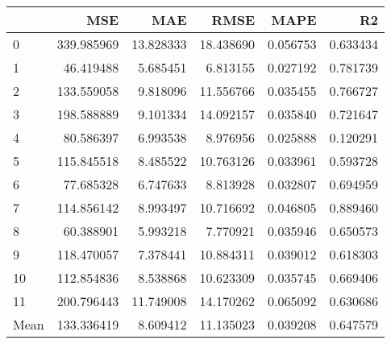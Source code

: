 \begin{tabular}{lrrrrr}
\toprule
 & MSE & MAE & RMSE & MAPE & R2 \\
\midrule
0 & 339.985969 & 13.828333 & 18.438690 & 0.056753 & 0.633434 \\
1 & 46.419488 & 5.685451 & 6.813155 & 0.027192 & 0.781739 \\
2 & 133.559058 & 9.818096 & 11.556766 & 0.035455 & 0.766727 \\
3 & 198.588889 & 9.101334 & 14.092157 & 0.035840 & 0.721647 \\
4 & 80.586397 & 6.993538 & 8.976956 & 0.025888 & 0.120291 \\
5 & 115.845518 & 8.485522 & 10.763126 & 0.033961 & 0.593728 \\
6 & 77.685328 & 6.747633 & 8.813928 & 0.032807 & 0.694959 \\
7 & 114.856142 & 8.993497 & 10.716692 & 0.046805 & 0.889460 \\
8 & 60.388901 & 5.993218 & 7.770921 & 0.035946 & 0.650573 \\
9 & 118.470057 & 7.378441 & 10.884311 & 0.039012 & 0.618303 \\
10 & 112.854836 & 8.538868 & 10.623309 & 0.035745 & 0.669406 \\
11 & 200.796443 & 11.749008 & 14.170262 & 0.065092 & 0.630686 \\
Mean & 133.336419 & 8.609412 & 11.135023 & 0.039208 & 0.647579 \\
\bottomrule
\end{tabular}
